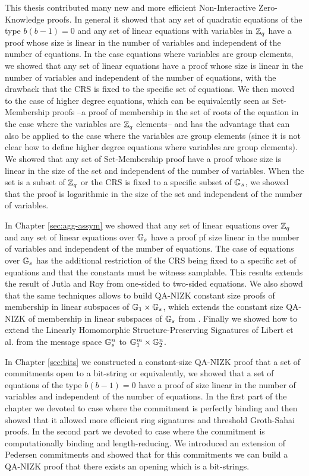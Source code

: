 This thesis contributed many new and more efficient Non-Interactive Zero-Knowledge proofs. In general it showed that any set of quadratic equations of the type $b(b-1)=0$ and any set of linear equations with variables in $\mathbb{Z}_q$ have a proof whose size is linear in the number of variables and independent of the number of equations. In the case equations where variables are group elements, we showed that any set of linear equations have a proof whose size is linear in the number of variables and independent of the number of equations, with the drawback that the CRS is fixed to the specific set of equations. We then moved to the case of higher degree equations, which can be equivalently seen as Set-Membership proofs --a proof of membership in the set of roots of the equation in the case where the variables are $\mathbb{Z}_q$ elements-- and has the advantage that can also be applied to the case where the variables are group elements (since it is not clear how to define higher degree equations where variables are group elements). We showed that any set of Set-Membership proof have a proof whose size is linear in the size of the set and independent of the number of variables. When the set is a subset of $\mathbb{Z}_q$ or the CRS is fixed to a specific subset of $\mathbb{G}_s$, we showed that the proof is logarithmic in the size of the set and independent of the number of variables.

In Chapter \ref{sec:agg-assym} we showed that any set of linear equations over $\mathbb{Z}_q$ and any set of linear equations over $\mathbb{G}_s$ have a proof pf size linear in the number of variables and independent of the number of equations. The case of equations over $\mathbb{G}_s$ has the additional restriction of the CRS being fixed to a specific set of equations and that the constants must be witness samplable. This results extends the result of Jutla and Roy \cite{C:JutRoy15} from one-sided to two-sided equations. We also showd that the same techniques allows to build QA-NIZK constant size proofs of membership in linear subspaces of $\mathbb{G}_1\times\mathbb{G}_s$, which extends the constant size QA-NIZK of membership in linear subspaces of $\mathbb{G}_s$ from \cite{EC:LPJY14,C:JutRoy15,EC:KilWee15,EC:AbdBenPoi15}. Finally we showed how to extend the Linearly Homomorphic Structure-Preserving Signatures of Libert et al. \cite{EC:LPJY14} from the message space $\mathbb{G}_s^n$ to $\mathbb{G}_1^m\times\mathbb{G}_2^n$.

In Chapter \ref{sec:bits} we constructed a constant-size QA-NIZK proof that a set of commitments open to a bit-string or equivalently, we showed that a set of equations of the type $b(b-1)=0$ have a proof of size linear in the number of variables and independent of the number of equations. In the first part of the chapter we devoted to case where the commitment is perfectly binding and then showed that it allowed more efficient ring signatures and threshold Groth-Sahai proofs. In the second part we devoted to case where the commitment is computationally binding and length-reducing. We introduced an extension of Pedersen commitments and showed that for this commitments we can build a QA-NIZK proof that there exists an opening which is a bit-strings.

